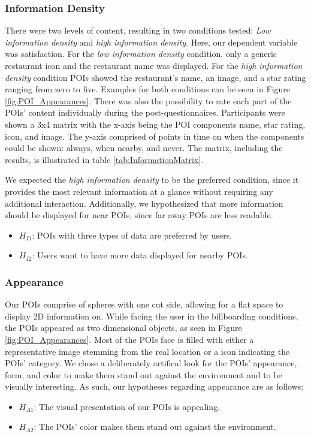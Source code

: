 \subsubsection*{\textbf{Information Density}}
There were two levels of content, resulting in two conditions tested: \textit{Low information density} and \textit{high information density}. Here, our dependent variable was satisfaction. For the \textit{low information density} condition, only a generic restaurant icon and the restaurant name was displayed. For the \textit{high information density} condition POIs showed the restaurant's name, an image, and a star rating ranging from zero to five. Examples for both conditions can be seen in Figure \ref{fig:POI_Appearances}. There was also the possibility to rate each part of the POIs' content individually during the post-questionnaires. Participants were shown a 3x4 matrix with the x-axis being the POI components name, star rating, icon, and image. The y-axis comprised of points in time on when the components could be shown: always, when nearby, and never. The matrix, including the results, is illustrated in table \ref{tab:InformationMatrix}.

We expected the \textit{high information density} to be the preferred condition, since it provides the most relevant information at a glance without requiring any additional interaction. Additionally, we hypothesized that more information should be displayed for near POIs, since far away POIs are less readable.

\begin{itemize}
    \item $H_{I1}$: POIs with three types of data are preferred by users.
    \item $H_{I2}$: Users want to have more data displayed for nearby POIs.
\end{itemize}



\subsubsection*{\textbf{Appearance}}
Our POIs comprise of spheres with one cut side, allowing for a flat space to display 2D information on. While facing the user in the billboarding conditions, the POIs appeared as two dimensional objects, as seen in Figure \ref{fig:POI_Appearances}. Most of the POIs face is filled with either a representative image stemming from the real location or a icon indicating the POIs' category. We chose a deliberately artifical look for the POIs' appearance, form, and color to make them stand out against the environment and to be visually interesting. As such, our hypotheses regarding appearance are as follows:
\begin{itemize}
    \item $H_{A1}$: The visual presentation of our POIs is appealing.
    \item $H_{A2}$: The POIs' color makes them stand out against the environment. 
\end{itemize}



